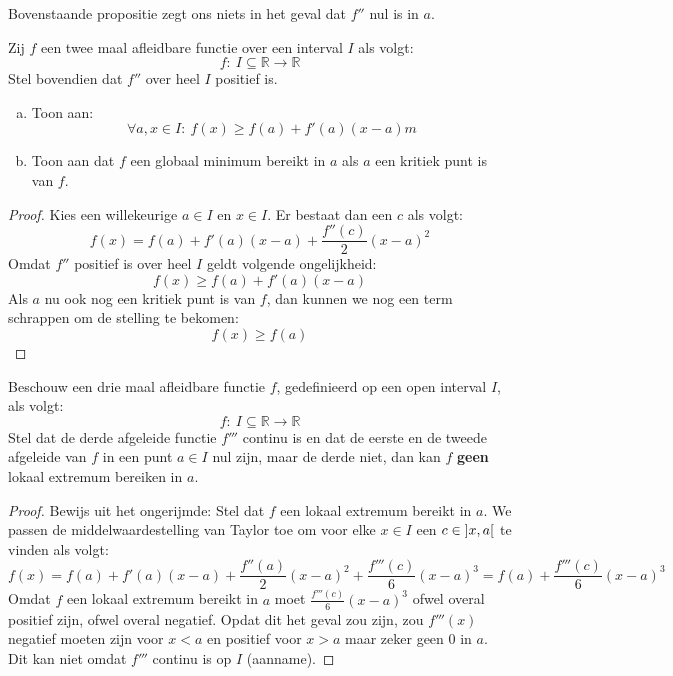 \documentclass[main.tex]{subfiles}
\begin{document}
\begin{opm}
  Bovenstaande propositie zegt ons niets in het geval dat $f''$ nul is in $a$.
\end{opm}


\begin{st}
  Zij $f$ een twee maal afleidbare functie over een interval $I$ als volgt:
  \[ f:\ I \subseteq \mathbb{R} \rightarrow \mathbb{R} \]
  Stel bovendien dat $f''$ over heel $I$ positief is.
  \begin{enumerate}[(a)]
  \item Toon aan:
    \[ \forall a,x \in I:\ f(x) \ge f(a) + f'(a)(x-a) m\]
  \item Toon aan dat $f$ een globaal minimum bereikt in $a$ als $a$ een kritiek punt is van $f$.
  \end{enumerate}

  \begin{proof}
    Kies een willekeurige $a\in I$ en $x\in I$.
    Er bestaat dan een $c$ als volgt: 
    \[ f(x) = f(a) + f'(a)(x-a) + \frac{f''(c)}{2}(x-a)^{2} \]
    Omdat $f''$ positief is over heel $I$ geldt volgende ongelijkheid:
    \[ f(x) \ge f(a) + f'(a)(x-a) \]
    Als $a$ nu ook nog een kritiek punt is van $f$, dan kunnen we nog een term schrappen om de stelling te bekomen:
    \[ f(x) \ge f(a) \]
\feed
  \end{proof}
\end{st}

\begin{st}
  Beschouw een drie maal afleidbare functie $f$, gedefinieerd op een open interval $I$, als volgt:
  \[ f:\ I \subseteq \mathbb{R} \rightarrow \mathbb{R} \] 
  Stel dat de derde afgeleide functie $f'''$ continu is en dat de eerste en de tweede afgeleide van $f$ in een punt $a\in I$ nul zijn, maar de derde niet, dan kan $f$ \textbf{geen} lokaal extremum bereiken in $a$.

  \begin{proof}
    Bewijs uit het ongerijmde: Stel dat $f$ een lokaal extremum bereikt in $a$.
    We passen de middelwaardestelling van Taylor toe om voor elke $x\in I$ een $c\in \interval[open]{x}{a}$ te vinden als volgt:
    \[ f(x)
    = f(a) + f'(a)(x-a) + \frac{f''(a)}{2}(x-a)^{2} + \frac{f'''(c)}{6}(x-a)^{3}
    = f(a) + \frac{f'''(c)}{6}(x-a)^{3}
    \]
    Omdat $f$ een lokaal extremum bereikt in $a$ moet $\frac{f'''(c)}{6}(x-a)^{3}$ ofwel overal positief zijn, ofwel overal negatief.
    Opdat dit het geval zou zijn, zou $f'''(x)$ negatief moeten zijn voor $x<a$ en positief voor $x>a$ maar zeker geen $0$ in $a$.
    Dit kan niet omdat $f'''$ continu is op $I$ (aanname).
  \end{proof}
\end{st}
\end{document}

